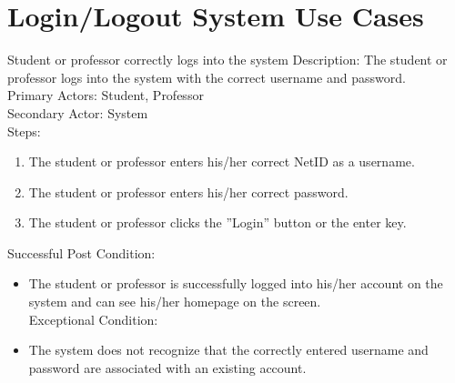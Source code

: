 
\chapter{Login/Logout System Use Cases}
    \begin{section}{Student or professor correctly logs into the system}
        Description: The student or professor logs into the system with the correct username and password.\\
        Primary Actors: Student, Professor\\
        Secondary Actor: System\\
        Steps:
        \begin{enumerate}
            \item The student or professor enters his/her correct NetID as a username.
            \item The student or professor enters his/her correct password.
            \item The student or professor clicks the ''Login'' button or the enter key.
        \end{enumerate}
        Successful Post Condition:\\
        \begin{itemize}
        \item The student or professor is successfully logged into his/her account on the system and can see his/her homepage on the screen.\\
        Exceptional Condition:
        \item The system does not recognize that the correctly entered username and password are associated with an existing account.
        \end{itemize}
        \end{section}
